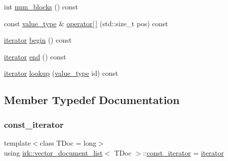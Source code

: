 \begin{DoxyCompactItemize}
\item 
int \mbox{\hyperlink{classirk_1_1vector__document__list_ab2ab2cef0d517240605010570f7765e8}{num\+\_\+blocks}} () const
\item 
const \mbox{\hyperlink{classirk_1_1vector__document__list_a0ec9c56f5e12a3a9101b5a18b2fbe69f}{value\+\_\+type}} \& \mbox{\hyperlink{classirk_1_1vector__document__list_a005d5854e07f49ade87827544cc88d7f}{operator\mbox{[}$\,$\mbox{]}}} (std\+::size\+\_\+t pos) const
\item 
\mbox{\hyperlink{classirk_1_1vector__document__list_a42499af78a7d66a1b626858cd424600f}{iterator}} \mbox{\hyperlink{classirk_1_1vector__document__list_a014b3737e63a4472e66ccb90a515f340}{begin}} () const
\item 
\mbox{\hyperlink{classirk_1_1vector__document__list_a42499af78a7d66a1b626858cd424600f}{iterator}} \mbox{\hyperlink{classirk_1_1vector__document__list_adafc0267ab0f84e5240011c96efd9681}{end}} () const
\item 
\mbox{\hyperlink{classirk_1_1vector__document__list_a42499af78a7d66a1b626858cd424600f}{iterator}} \mbox{\hyperlink{classirk_1_1vector__document__list_af25b19f3edd8c826dea2c2a8523c2772}{lookup}} (\mbox{\hyperlink{classirk_1_1vector__document__list_a0ec9c56f5e12a3a9101b5a18b2fbe69f}{value\+\_\+type}} id) const
\end{DoxyCompactItemize}


\subsection{Member Typedef Documentation}
\mbox{\label{classirk_1_1vector__document__list_a91539ec8ebd87cd47957107df90744aa}} 
\subsubsection{\texorpdfstring{const\+\_\+iterator}{const\_iterator}}
{\footnotesize\ttfamily template$<$class T\+Doc  = long$>$ \\
using \mbox{\hyperlink{classirk_1_1vector__document__list}{irk\+::vector\+\_\+document\+\_\+list}}$<$ T\+Doc $>$\+::\mbox{\hyperlink{classirk_1_1vector__document__list_a91539ec8ebd87cd47957107df90744aa}{const\+\_\+iterator}} =  \mbox{\hyperlink{classirk_1_1vector__document__list_a42499af78a7d66a1b626858cd424600f}{iterator}}}

